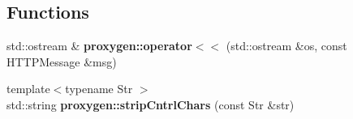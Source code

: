 \subsection*{Functions}
\begin{DoxyCompactItemize}
\item 
std\+::ostream \& {\bf proxygen\+::operator$<$$<$} (std\+::ostream \&os, const H\+T\+T\+P\+Message \&msg)
\item 
{\footnotesize template$<$typename Str $>$ }\\std\+::string {\bf proxygen\+::strip\+Cntrl\+Chars} (const Str \&str)
\end{DoxyCompactItemize}

